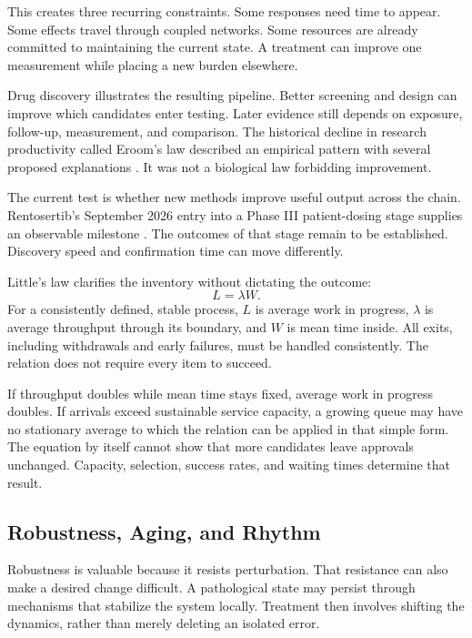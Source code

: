 This creates three recurring constraints. Some responses need time to appear. Some effects travel through coupled networks. Some resources are already committed to maintaining the current state. A treatment can improve one measurement while placing a new burden elsewhere.

Drug discovery illustrates the resulting pipeline. Better screening and design can improve which candidates enter testing. Later evidence still depends on exposure, follow-up, measurement, and comparison. The historical decline in research productivity called Eroom's law described an empirical pattern with several proposed explanations \cite{scannell2012diagnosing}. It was not a biological law forbidding improvement.

The current test is whether new methods improve useful output across the chain. Rentosertib's September 2026 entry into a Phase III patient-dosing stage supplies an observable milestone \cite{insilico2026phase3}. The outcomes of that stage remain to be established. Discovery speed and confirmation time can move differently.

Little's law clarifies the inventory without dictating the outcome:
\begin{equation}
 L=\lambda W.
\end{equation}
For a consistently defined, stable process, $L$ is average work in progress, $\lambda$ is average throughput through its boundary, and $W$ is mean time inside. All exits, including withdrawals and early failures, must be handled consistently. The relation does not require every item to succeed.

If throughput doubles while mean time stays fixed, average work in progress doubles. If arrivals exceed sustainable service capacity, a growing queue may have no stationary average to which the relation can be applied in that simple form. The equation by itself cannot show that more candidates leave approvals unchanged. Capacity, selection, success rates, and waiting times determine that result.

\subsection{Robustness, Aging, and Rhythm}

Robustness is valuable because it resists perturbation. That resistance can also make a desired change difficult. A pathological state may persist through mechanisms that stabilize the system locally. Treatment then involves shifting the dynamics, rather than merely deleting an isolated error.

